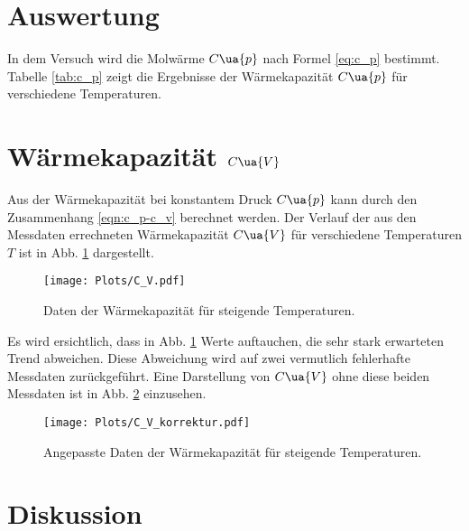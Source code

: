 \section{Auswertung}
\label{sec:auswertung}

In dem Versuch wird die Molwärme $C\ua{p}$ nach Formel \eqref{eq:c_p}
bestimmt. Tabelle \ref{tab:c_p} zeigt die Ergebnisse der
Wärmekapazität $C\ua{p}$ für verschiedene Temperaturen.




\section{Wärmekapazität $C\ua{V}$}

Aus der Wärmekapazität bei konstantem Druck $C\ua{p}$ kann
durch den Zusammenhang \eqref{eqn:c_p-c_v} berechnet werden.
Der Verlauf der aus den Messdaten errechneten Wärmekapazität $C\ua{V}$
für verschiedene Temperaturen $T$ ist in Abb. \ref{fig:c_v} dargestellt.

\begin{figure}
  \centering
  \texttt{[image: Plots/C\_V.pdf]}
  \caption{Daten der Wärmekapazität für steigende Temperaturen.}
  \label{fig:c_v}
\end{figure}

Es wird ersichtlich, dass in Abb. \ref{fig:c_v} Werte auftauchen, die sehr
stark erwarteten Trend abweichen.
Diese Abweichung wird auf zwei vermutlich fehlerhafte Messdaten zurückgeführt.
Eine Darstellung von $C\ua{V}$ ohne diese beiden Messdaten ist in Abb. \ref{fig:c_v_korrektur}
einzusehen.

\begin{figure}
  \centering
  \texttt{[image: Plots/C\_V\_korrektur.pdf]}
  \caption{Angepasste Daten der Wärmekapazität für steigende Temperaturen.}
  \label{fig:c_v_korrektur}
\end{figure}

\section{Diskussion}
\label{sec:diskussion}
